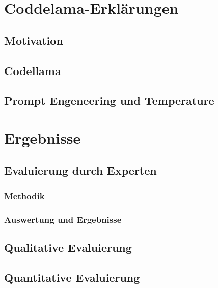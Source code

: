 \documentclass[12pt,letterpaper,ngerman]{article}
\begin{document}
\section{Coddelama-Erklärungen}
\subsection{Motivation}
\subsection{Codellama} 
\subsection{Prompt Engeneering und Temperature}
\section{Ergebnisse}
\subsection{Evaluierung durch Experten}
\subsubsection{Methodik}
\subsubsection{Auswertung und Ergebnisse}
\subsection{Qualitative Evaluierung} 
\subsection{Quantitative Evaluierung} 
\end{document}
